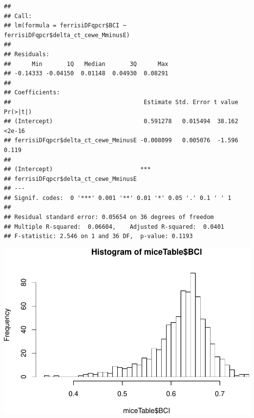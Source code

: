\documentclass[]{article}
\newenvironment{Shaded}{\begin{snugshade}}{\end{snugshade}}
\newcommand{\KeywordTok}[1]{\textcolor[rgb]{0.13,0.29,0.53}{\textbf{#1}}}
\newcommand{\DataTypeTok}[1]{\textcolor[rgb]{0.13,0.29,0.53}{#1}}
\newcommand{\DecValTok}[1]{\textcolor[rgb]{0.00,0.00,0.81}{#1}}
\newcommand{\StringTok}[1]{\textcolor[rgb]{0.31,0.60,0.02}{#1}}
\newcommand{\OperatorTok}[1]{\textcolor[rgb]{0.81,0.36,0.00}{\textbf{#1}}}
\newcommand{\NormalTok}[1]{#1}
\begin{document}
\begin{Shaded}
\end{Shaded}

\begin{verbatim}
## 
## Call:
## lm(formula = ferrisiDFqpcr$BCI ~ ferrisiDFqpcr$delta_ct_cewe_MminusE)
## 
## Residuals:
##      Min       1Q   Median       3Q      Max 
## -0.14333 -0.04150  0.01148  0.04930  0.08291 
## 
## Coefficients:
##                                      Estimate Std. Error t value Pr(>|t|)
## (Intercept)                          0.591278   0.015494  38.162   <2e-16
## ferrisiDFqpcr$delta_ct_cewe_MminusE -0.008099   0.005076  -1.596    0.119
##                                        
## (Intercept)                         ***
## ferrisiDFqpcr$delta_ct_cewe_MminusE    
## ---
## Signif. codes:  0 '***' 0.001 '**' 0.01 '*' 0.05 '.' 0.1 ' ' 1
## 
## Residual standard error: 0.05654 on 36 degrees of freedom
## Multiple R-squared:  0.06604,    Adjusted R-squared:  0.0401 
## F-statistic: 2.546 on 1 and 36 DF,  p-value: 0.1193
\end{verbatim}

\begin{Shaded}
\end{Shaded}

\includegraphics{Data_Analysis_Alice_files/figure-latex/unnamed-chunk-1-6.pdf}
\end{document}
